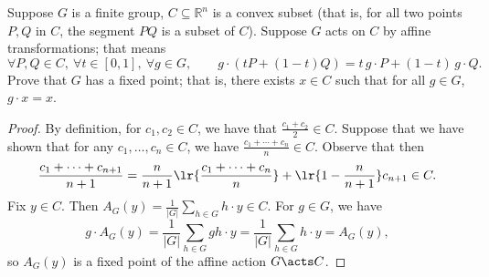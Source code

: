 \documentclass[12pt]{article}
\begin{document}
\begin{homeworkProblem}
Suppose $G$ is a finite group, $C \subseteq \mathbb{R}^n$ is a convex subset (that is, for all two points $P,Q$ in $C$, the segment $PQ$ is a subset of $C$). Suppose $G$ acts on $C$ by affine transformations; that means
\[
  \forall P,Q \in C,\ \forall t \in [0,1],\ \forall g \in G,\qquad g\cdot (tP+(1-t)Q)=t\,g\cdot P + (1-t)\,g\cdot Q.
\]
Prove that $G$ has a fixed point; that is, there exists $x \in C$ such that for all $g \in G$, $g\cdot x = x$.

\begin{proof}
  By definition, for $ c_{1},c_{2}\in C $, we have that $ \frac{c_{1}+c_{2}}{2}\in C $. Suppose that we have shown that for any $ c_{1},\ldots, c_{n}\in C $, we have $ \frac{c_{1}+\cdots+c_{n}}{n}\in C $. Observe that then
  \[
    \frac{c_{1}+ \cdots + c_{n+1}}{n+1} = \frac{n}{n+1}\lr{\frac{c_{1}+\cdots + c_{n}}{n}} + \lr{1-\frac{n}{n+1}} c_{n+1}\in C.
  \]
  Fix $ y\in C $. Then $ A_{G}(y) = \frac{1}{|G|}\sum_{h\in G}h\cdot y\in C $. For $ g\in G $, we have 
  \[
    g\cdot A_{G}(y) = \frac{1}{|G|}\sum_{h\in G} gh\cdot y = \frac{1}{|G|}\sum_{h\in G} h\cdot y = A_{G}(y),
  \]
  so $ A_{G}(y) $ is a fixed point of the affine action $ G\acts C $.

\end{proof}


\end{homeworkProblem}
\end{document}

